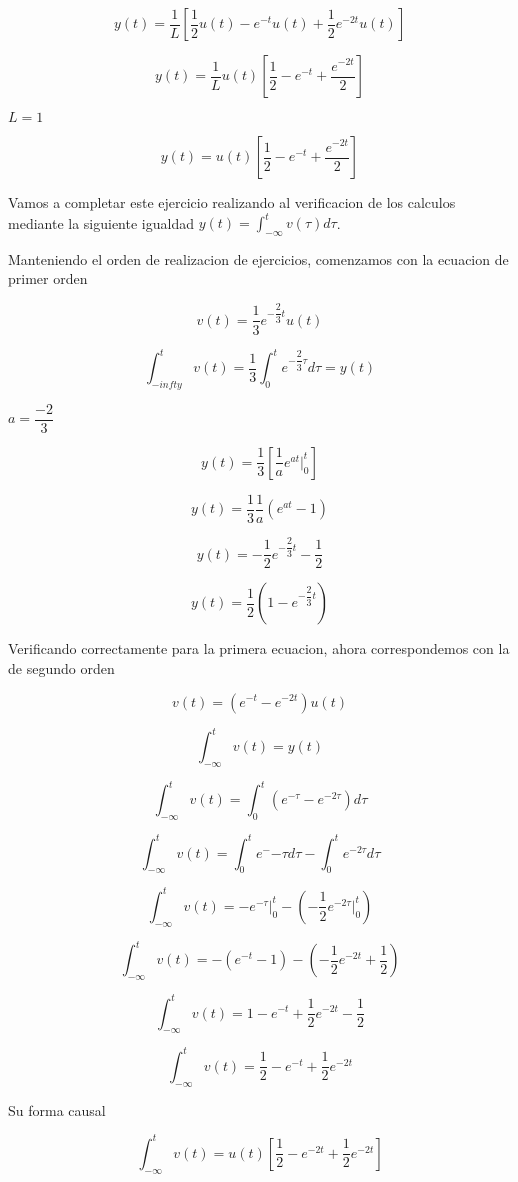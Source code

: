 $$y(t) = \dfrac{1}{L} [\dfrac{1}{2} u(t) - e^{-t} u(t) + \dfrac{1}{2} e^{-2t} u(t)] $$

$$y(t) = \dfrac{1}{L} u(t) [\dfrac{1}{2} - e^{-t} + \dfrac{e^{-2t}}{2}]$$

$L = 1$

$$y(t) = u(t) [\dfrac{1}{2} - e^{-t} + \dfrac{e^{-2t}}{2}] $$

Vamos a completar este ejercicio realizando al verificacion de los calculos mediante la siguiente igualdad $y(t) = \int_{-\infty}^{t} v(\tau) d\tau$.

Manteniendo el orden de realizacion de ejercicios, comenzamos con la ecuacion de primer orden

$$v(t) = \dfrac{1}{3} e^{-\dfrac{2}{3}t} u(t)$$

$$\int_{-infty}^{t} v(t) = \dfrac{1}{3} \int_{0}^{t} e^{-\dfrac{2}{3}\tau} d\tau = y(t) $$

$a = \dfrac{-2}{3}$

$$y(t) = \dfrac{1}{3} [\dfrac{1}{a} e^{at} \bigg\rvert_{0}^{t}] $$

$$y(t) = \dfrac{1}{3} \dfrac{1}{a} (e^{at} - 1) $$

$$y(t) = -\dfrac{1}{2} e^{-\dfrac{2}{3}t} - \dfrac{1}{2} $$

$$y(t) = \dfrac{1}{2} (1 - e^{-\dfrac{2}{3}t}) $$ 

Verificando correctamente para la primera ecuacion, ahora correspondemos con la de segundo orden

$$v(t) = (e^{-t} - e^{-2t}) u(t) $$

$$\int_{-\infty}^{t} v(t) = y(t) $$

$$\int_{-\infty}^{t} v(t) = \int_{0}^{t} (e^{-\tau} - e^{-2\tau}) d\tau $$

$$\int_{-\infty}^{t} v(t) = \int_{0}^{t} e^-{-\tau} d\tau - \int_{0}^{t} e^{-2\tau} d\tau $$ 

$$\int_{-\infty}^{t} v(t) = -e^{-\tau}\bigg\rvert_{0}^{t} - (-\dfrac{1}{2} e^{-2\tau} \bigg\rvert_{0}^{t}) $$

$$\int_{-\infty}^{t} v(t) = -(e^{-t} - 1) - (-\dfrac{1}{2} e^{-2t} + \dfrac{1}{2}) $$

$$\int_{-\infty}^{t} v(t) = 1 - e^{-t} + \dfrac{1}{2} e^{-2t} - \dfrac{1}{2}$$

$$\int_{-\infty}^{t} v(t) = \dfrac{1}{2} - e^{-t} + \dfrac{1}{2} e^{-2t}$$

Su forma causal

$$\int_{-\infty}^{t} v(t) = u(t) [\dfrac{1}{2} - e^{-2t} + \dfrac{1}{2} e^{-2t}]$$

